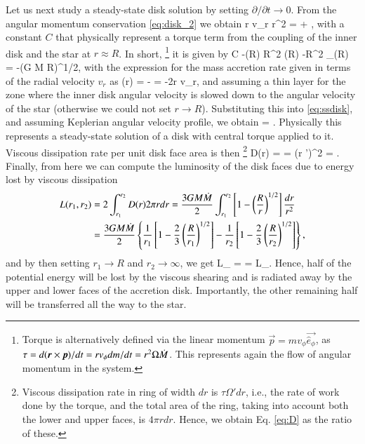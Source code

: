 Let us next study a steady-state disk solution by setting $\partial/\partial t \rightarrow 0$.
From the angular momentum conservation \eqref{eq:disk_2} we obtain
\be\label{eq:ssdisk}
r \Sigma v_{r} r^2 \Omega = \frac{\tau}{2\pi} + ,
\ee
with a constant $C$ that physically represent a torque term from the coupling of the inner disk and the star at $r \approx R$.
In short,%
\footnote{Torque is alternatively defined via the linear momentum $\vec{p} = m v_{\phi} \vec{\hat{e}_{\phi}}$, as $\tau = d(\boldsymbol{r} \times \boldsymbol{p})/dt = r v_{\phi} dm/dt = r^2 \Omega \dot{M}$. 
This represents again the flow of angular momentum in the system.
}
it is given by
\be\label{eq:visc_torque}
C \approx -\Mdot(R) R^2 \Omega(R) \approx -\Mdot R^2 \Omega_{}(R) = -\Mdot (G M R)^{1/2},
\ee
with the expression for the mass accretion rate given in terms of the radial velocity $v_r$ as
\be
\Mdot(r) = - = -2\pi r \Sigma v_r,
\ee
and assuming a thin layer for the zone where the inner disk angular velocity is slowed down to the angular velocity of the star (otherwise we could not set $r \rightarrow R$).
Substituting this into \eqref{eq:ssdisk}, and assuming Keplerian angular velocity profile, we obtain
\be
\nu \Sigma = \frac{\Mdot}{3\pi} .
\ee
Physically this represents a steady-state solution of a disk with central torque applied to it.
Viscous dissipation rate per unit disk face area is then%
\footnote{Viscous dissipation rate in ring of width $dr$ is $\tau \Omega' dr$, i.e., the rate of work done by the torque, and the total area of the ring, taking into account both the lower and upper faces, is $4\pi r dr$. Hence, we obtain Eq. \eqref{eq:D} as the ratio of these.
}
\be\label{eq:D}
D(r) =  =  \nu \Sigma (r \Omega')^2 =  .
\ee
Finally, from here we can compute the luminosity of the disk faces due to energy lost by viscous dissipation
\begin{align}\begin{split}
    L(r_1, r_2)  &= 2 \int_{r_1}^{r_2} D(r) 2\pi r dr = \frac{3 G M \dot{M}}{2} \int_{r_1}^{r_2} \left[ 1 - \left( \frac{R}{r} \right)^{1/2} \right] \frac{dr}{r^2} \\
 & = \frac{3 G M \dot{M}}{2} \left\{ \frac{1}{r_1} \left[ 1 - \frac{2}{3}\left( \frac{R}{r_1} \right)^{1/2} \right] -  \frac{1}{r_2} \left[ 1 - \frac{2}{3}\left( \frac{R}{r_2} \right)^{1/2} \right] \right\}, 
\end{split}\end{align}
and by then setting $r_1 \rightarrow R$ and $r_2 \rightarrow \infty$, we get
\be
L_{} =  =  L_{}.
\ee
Hence, half of the potential energy will be lost by the viscous shearing and is radiated away by the upper and lower faces of the accretion disk.
Importantly, the other remaining half will be transferred all the way to the star.

